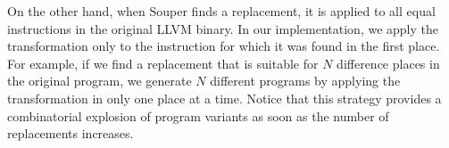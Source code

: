 On the other hand, when Souper finds a replacement, it is applied to all equal instructions in the original LLVM binary. In our implementation, we apply the transformation only to the instruction for which it was found in the first place. For example, if we find a replacement that is suitable for $N$ difference places in the original program, we generate $N$ different programs by applying the transformation in only one place at a time. Notice that this strategy provides a combinatorial explosion of program variants as soon as the number of replacements increases.

